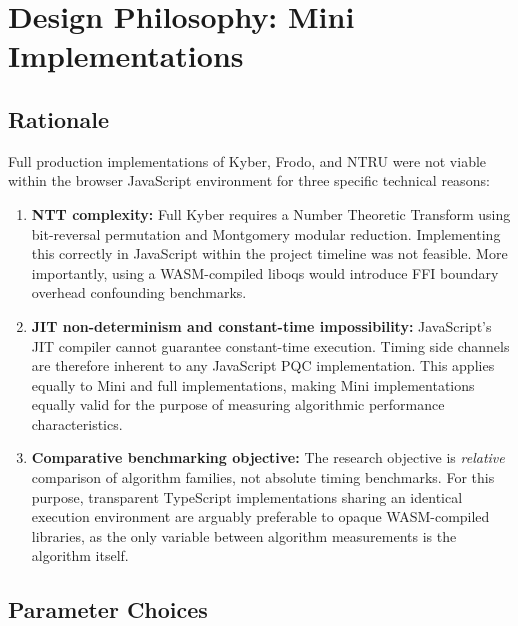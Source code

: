 \documentclass[12pt,a4paper]{report}
\begin{document}
\section{Design Philosophy: Mini Implementations}

\subsection{Rationale}

Full production implementations of Kyber, Frodo, and NTRU were not viable within the
browser JavaScript environment for three specific technical reasons:

\begin{enumerate}
  \item \textbf{NTT complexity:} Full Kyber requires a Number Theoretic Transform
  using bit-reversal permutation and Montgomery modular reduction. Implementing this
  correctly in JavaScript within the project timeline was not feasible. More
  importantly, using a WASM-compiled liboqs would introduce FFI boundary overhead
  confounding benchmarks.

  \item \textbf{JIT non-determinism and constant-time impossibility:} JavaScript's
  JIT compiler cannot guarantee constant-time execution. Timing side channels are
  therefore inherent to any JavaScript PQC implementation. This applies equally to
  Mini and full implementations, making Mini implementations equally valid for the
  purpose of measuring algorithmic performance characteristics.

  \item \textbf{Comparative benchmarking objective:} The research objective is
  \emph{relative} comparison of algorithm families, not absolute timing benchmarks.
  For this purpose, transparent TypeScript implementations sharing an identical
  execution environment are arguably preferable to opaque WASM-compiled libraries,
  as the only variable between algorithm measurements is the algorithm itself.
\end{enumerate}

\subsection{Parameter Choices}
\end{document}
